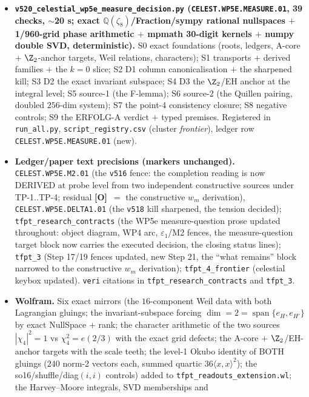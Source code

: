 \documentclass[11pt]{article}
\providecommand{\mO}{\textbf{[O]}}\providecommand{\mX}{\textbf{[X]}}
\providecommand{\Q}{\mathbb{Q}}
\begin{document}
\begin{itemize}[leftmargin=1.5em]
\item \textbf{\texttt{v520\_celestial\_wp5e\_measure\_decision.py} (\texttt{CELEST.WP5E.MEASURE.01},
39 checks, $\sim$20 s; exact $\Q(\zeta_8)$/Fraction/sympy rational nullspaces $+$ 1/960-grid
phase arithmetic $+$ mpmath 30-digit kernels $+$ numpy double SVD, deterministic).} S0 exact
foundations (roots, ledgers, A-core $+$ $\Z_2$-anchor targets, Weil relations, characters); S1
transports $+$ derived families $+$ the $k=0$ slice; S2 D1 column canonicalisation $+$ the
sharpened kill; S3 D2 the exact invariant subspace; S4 D3 the $\Z_2$/EH anchor at the integral
level; S5 source-1 (the F-lemma); S6 source-2 (the Quillen pairing, doubled $256$-dim system);
S7 the point-4 consistency closure; S8 negative controls; S9 the ERFOLG-A verdict $+$ typed
premises. Registered in \texttt{run\_all.py}, \texttt{script\_registry.csv} (cluster
\emph{frontier}), ledger row \texttt{CELEST.WP5E.MEASURE.01} (new).
\item \textbf{Ledger/paper text precisions (markers unchanged).} \texttt{CELEST.WP5E.M2.01}
(the \texttt{v516} fence: the completion reading is now DERIVED at probe level from two
independent constructive sources under TP-1..TP-4; residual \mO\ $=$ the constructive $w_m$
derivation), \texttt{CELEST.WP5E.DELTA1.01} (the \texttt{v518} kill sharpened, the tension
decided); \texttt{tfpt\_research\_contracts} (the WP5e measure-question prose updated
throughout: object diagram, WP4 arc, $\varepsilon_1$/M2 fences, the measure-question target
block now carries the executed decision, the closing status lines);
\texttt{tfpt\_3} (Step 17/19 fences updated, new Step 21, the ``what remains'' block narrowed
to the constructive $w_m$ derivation); \texttt{tfpt\_4\_frontier} (celestial keybox updated).
\texttt{veri} citations in \texttt{tfpt\_research\_contracts} and \texttt{tfpt\_3}.
\item \textbf{Wolfram.} Six exact mirrors (the $16$-component Weil data with both Lagrangian
gluings; the invariant-subspace forcing $\dim=2=\operatorname{span}\{e_H,e_{H'}\}$ by exact
NullSpace $+$ rank; the character arithmetic of the two sources $|\chi_4|^2=1$ vs
$\chi_4^2=e(2/3)$ with the exact grid defects; the A-core $+$ $\Z_2$/EH-anchor targets with
the scale teeth; the level-1 Okubo identity of BOTH gluings ($240$ norm-2 vectors each, summed
quartic $36\langle x,x\rangle^2$); the so16/shuffle/diag$(i,i)$ controls) added to
\texttt{tfpt\_readouts\_extension.wl}; the Harvey--Moore integrals, SVD memberships and

\end{itemize}
\end{document}
